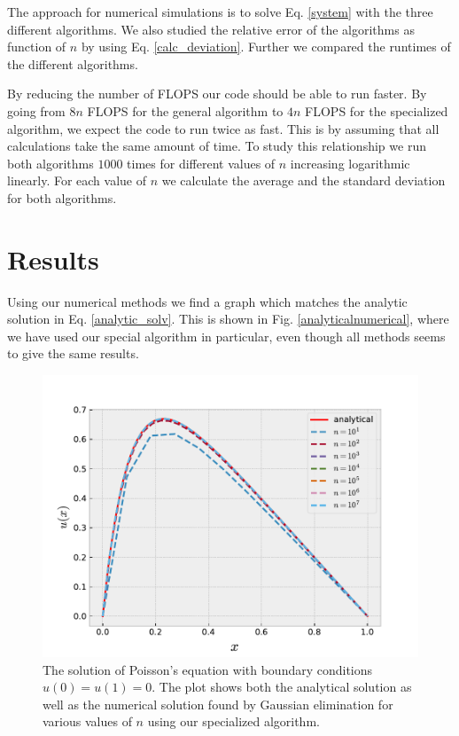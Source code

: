 \documentclass[%
 reprint,
nofootinbib,
 amsmath,amssymb,
 aps,
]{revtex4-1}
\begin{document}
The approach for numerical simulations is to solve Eq. \eqref{system} with the three different algorithms. We also studied the relative error of the algorithms as function of $n$ by using Eq. \eqref{calc_deviation}. Further we compared the runtimes of the different algorithms.

By reducing the number of FLOPS our code should be able to run faster. By going from $8n$ FLOPS for the general algorithm to $4n$ FLOPS for the specialized algorithm, we expect the code to run twice as fast. This is by assuming that all calculations take the same amount of time. To study this relationship we run both algorithms $1000$ times for different values of $n$ increasing logarithmic linearly. For each value of $n$ we calculate the average and the standard deviation for both algorithms.


\section{Results}
Using our numerical methods we find a graph which matches the analytic solution in Eq. \eqref{analytic_solv}. This is shown in Fig. \vref{analyticalnumerical}, where we have used our special algorithm in particular, even though all methods seems to give the same results.
\begin{figure}
\centering
\includegraphics[scale=0.5]{../figures/graphs.pdf}
\caption{The solution of Poisson's equation with boundary conditions $u(0) = u(1) = 0$. The plot shows both the analytical solution as well as the numerical solution found by Gaussian elimination for various values of $n$ using our specialized algorithm.}
\label{analyticalnumerical}
\end{figure}
\end{document}
